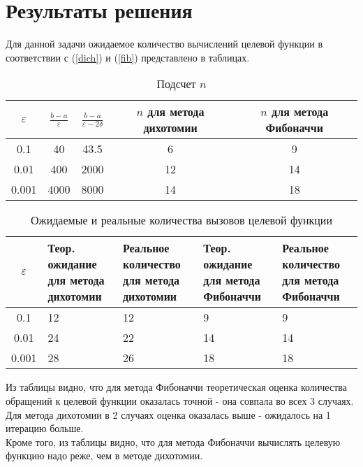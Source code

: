 \section{Результаты решения}
Для данной задачи ожидаемое количество вычислений целевой функции в соответствии с (\ref{dich}) и (\ref{fib}) представлено в таблицах.

\begin{table}[h]
	\centering
		\begin{tabular} {|c|c|c|c|c|}
			\hline
			$\varepsilon$ & $\frac{b-a}{\varepsilon}$ & $\frac{b-a}{\varepsilon - 2\delta}$ & $n$ для метода дихотомии & $n$ для метода Фибоначчи \\ \hline
			0.1 & 40 & 43.5 &6 & 9\\ \hline
			0.01 & 400 & 2000 & 12 & 14\\ \hline
			0.001 & 4000 & 8000 & 14 &  18\\ \hline
		\end{tabular}
		\caption{Подсчет $n$}
	\end{table}
		\newpage

\begin{table}[h]
	\centering
		\begin{tabular} {|c|m{3 cm}|m{3 cm}|m{3 cm}|m{3 cm}|}
			\hline
			$\varepsilon$ & Теор. ожидание для метода дихотомии & Реальное количество для метода дихотомии &Теор. ожидание для метода Фибоначчи & Реальное количество для метода Фибоначчи  \\ \hline
			0.1 & 12 & 12 & 9 & 9\\ \hline
			0.01 & 24 & 22 & 14 & 14\\ \hline
			0.001 & 28 & 26 & 18 &  18\\ \hline
		\end{tabular}
		\caption{Ожидаемые и реальные количества вызовов целевой функции}
	\end{table}

Из таблицы видно, что для метода Фибоначчи теоретическая оценка количества обращений к целевой функции оказалась точной - она совпала во всех 3 случаях. Для метода дихотомии в 2 случаях оценка оказалась выше - ожидалось на 1 итерацию больше.\\
Кроме того, из таблицы видно, что для метода Фибоначчи вычислять целевую функцию надо реже, чем в методе дихотомии.

